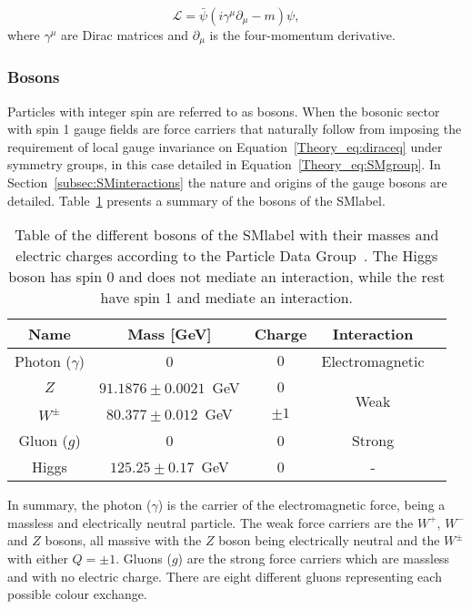 \begin{equation}
\label{Theory_eq:diraceq}
    \mathcal{L} = \bar{\psi}(i\gamma^\mu\partial_\mu-m)\psi,
\end{equation}
where $\gamma^\mu$ are Dirac matrices and $\partial_\mu$ is the four-momentum derivative.

\subsubsection{Bosons}

Particles with integer spin are referred to as bosons. When the bosonic sector with spin 1 gauge fields are force carriers that naturally follow from imposing the requirement of local gauge invariance on Equation~\ref{Theory_eq:diraceq} under symmetry groups, in this case detailed in Equation~\ref{Theory_eq:SMgroup}. In Section~\ref{subsec:SMinteractions} the nature and origins of the gauge bosons are detailed. Table~\ref{tabSM:bosonscontent} presents a summary of the bosons of the \acrshort{SMlabel}.\\

\begin{table}[htbp]
    \begin{tabular}{ccccc}
    \toprule\toprule
    Name                  & Mass [GeV] & Charge & Interaction \\ \midrule
    Photon ($\gamma$)     &  0                             &  $0$ & Electromagnetic\\
    $Z$                   &  $91.1876 \pm 0.0021$~GeV      &  $0$ & \multirow{2}{*}{Weak} \\
    $W^\pm$               &  $80.377\pm 0.012$~GeV         &  $\pm 1$ & \\
    Gluon ($g$)           &  0                             &  0 & Strong \\
    Higgs                 &  $125.25\pm0.17$~GeV           &  0      & - \\
    \bottomrule\bottomrule
    \end{tabular}
    \caption{Table of the different bosons of the \acrshort{SMlabel} with their masses and electric charges according to the Particle Data Group~\cite{pdg}. The Higgs boson has spin 0 and does not mediate an interaction, while the rest have spin 1 and mediate an interaction.}
    \label{tabSM:bosonscontent}
    \end{table}

In summary, the photon ($\gamma$) is the carrier of the electromagnetic force, being a massless and electrically neutral particle.
The weak force carriers are the $W^+$, $W^-$ and $Z$ bosons, all massive with the $Z$ boson being electrically neutral and the $W^\pm$ with either $Q=\pm1$. Gluons ($g$) are the strong force carriers which are massless and with no electric charge. There are eight different gluons representing each possible colour exchange.\\

